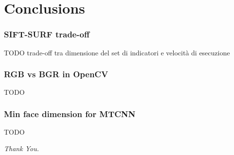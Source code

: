 \documentclass{beamer}
\begin{document}
	\section{Conclusions}
	\begin{frame}
		\frametitle{SIFT-SURF trade-off}
		TODO trade-off tra dimensione del set di indicatori e velocità di esecuzione
	\end{frame}
	
	\begin{frame}
		\frametitle{RGB vs BGR in OpenCV}
		TODO
	\end{frame}
	
	\begin{frame}
		\frametitle{Min face dimension for MTCNN}
		TODO
	\end{frame}
	
	\begin{frame}
		\centering \Huge
		\emph{Thank You.}
	\end{frame}
\end{document}
